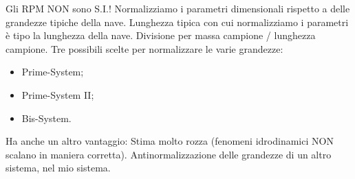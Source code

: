 Gli RPM NON sono S.I.! Normalizziamo i parametri dimensionali rispetto a delle grandezze tipiche della nave. Lunghezza tipica con cui normalizziamo i parametri è tipo la lunghezza della nave. Divisione per massa campione / lunghezza campione. Tre possibili scelte per normalizzare le varie grandezze:

\begin{itemize}

\item Prime-System;
\item Prime-System II;
\item Bis-System.
\end{itemize} 

Ha anche un altro vantaggio: Stima molto rozza (fenomeni idrodinamici NON scalano in maniera corretta). Antinormalizzazione delle grandezze di un altro sistema, nel mio sistema.